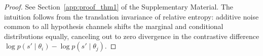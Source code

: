 \begin{proof}
See Section~\ref{app:proof_thm1} of the Supplementary Material. The intuition follows from the translation invariance of relative entropy: additive noise common to all hypothesis channels shifts the marginal and conditional distributions equally, canceling out to zero divergence in the contrastive difference $\log p(s' \mid \theta_i) - \log p(s' \mid \theta_j)$.
\end{proof}
